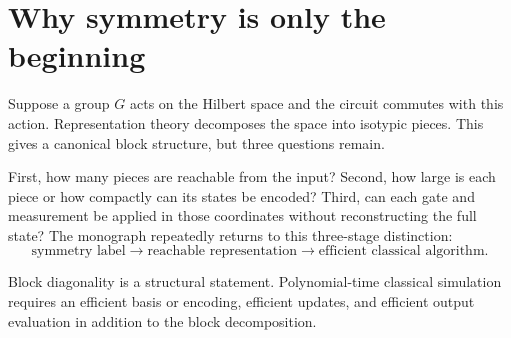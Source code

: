 \section{Why symmetry is only the beginning}
Suppose a group $G$ acts on the Hilbert space and the circuit commutes with this action. Representation theory decomposes the space into isotypic pieces. This gives a canonical block structure, but three questions remain.

First, how many pieces are reachable from the input? Second, how large is each piece or how compactly can its states be encoded? Third, can each gate and measurement be applied in those coordinates without reconstructing the full state? The monograph repeatedly returns to this three-stage distinction:
\[
\text{symmetry label}
\longrightarrow
\text{reachable representation}
\longrightarrow
\text{efficient classical algorithm}.
\]

\begin{principle}
Block diagonality is a structural statement. Polynomial-time classical simulation requires an efficient basis or encoding, efficient updates, and efficient output evaluation in addition to the block decomposition.
\end{principle}
